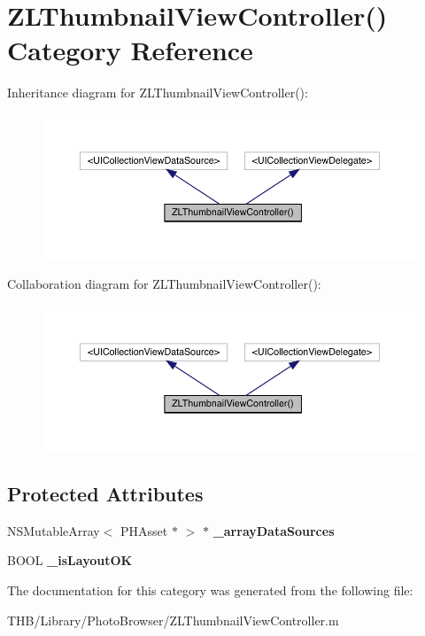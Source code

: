 \hypertarget{category_z_l_thumbnail_view_controller_07_08}{}\section{Z\+L\+Thumbnail\+View\+Controller() Category Reference}
\label{category_z_l_thumbnail_view_controller_07_08}


Inheritance diagram for Z\+L\+Thumbnail\+View\+Controller()\+:\nopagebreak
\begin{figure}[H]
\begin{center}
\leavevmode
\includegraphics[width=350pt]{category_z_l_thumbnail_view_controller_07_08__inherit__graph}
\end{center}
\end{figure}


Collaboration diagram for Z\+L\+Thumbnail\+View\+Controller()\+:\nopagebreak
\begin{figure}[H]
\begin{center}
\leavevmode
\includegraphics[width=350pt]{category_z_l_thumbnail_view_controller_07_08__coll__graph}
\end{center}
\end{figure}
\subsection*{Protected Attributes}
\begin{DoxyCompactItemize}
\item 
\mbox{\label{category_z_l_thumbnail_view_controller_07_08_aaafbaa107ebd471faf2acf4a4ca5b5ec}} 
N\+S\+Mutable\+Array$<$ P\+H\+Asset $\ast$ $>$ $\ast$ {\bfseries \+\_\+array\+Data\+Sources}
\item 
\mbox{\label{category_z_l_thumbnail_view_controller_07_08_a16599a3dc9792ca597373058a5aa24d7}} 
B\+O\+OL {\bfseries \+\_\+is\+Layout\+OK}
\end{DoxyCompactItemize}


The documentation for this category was generated from the following file\+:\begin{DoxyCompactItemize}
\item 
T\+H\+B/\+Library/\+Photo\+Browser/Z\+L\+Thumbnail\+View\+Controller.\+m\end{DoxyCompactItemize}
